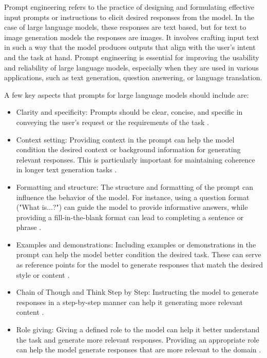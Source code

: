 Prompt engineering refers to the practice of designing and formulating effective input prompts or instructions to elicit desired responses from the model. In the case of large language models, these responses are text based, but for text to image generation models the responses are images. It involves crafting input text in such a way that the model produces outputs that align with the user's intent and the task at hand. Prompt engineering is essential for improving the usability and reliability of large language models, especially when they are used in various applications, such as text generation, question answering, or language translation. \cite{white2023prompt,zhou2022learning,oppenlaender2022prompt,reynolds2021prompt}

A few key aspects that prompts for large language models should include are:
\begin{itemize}
    \item Clarity and specificity: Prompts should be clear, concise, and specific in conveying the user's request or the requirements of the task \cite{}.
    \item Context setting: Providing context in the prompt can help the model condition the desired context or background information for generating relevant responses. This is particularly important for maintaining coherence in longer text generation tasks \cite{}.
    \item Formatting and structure: The structure and formatting of the prompt can influence the behavior of the model. For instance, using a question format ("What is...?") can guide the model to provide informative answers, while providing a fill-in-the-blank format can lead to completing a sentence or phrase \cite{gao2023prompt}.
    \item Examples and demonstrations: Including examples or demonstrations in the prompt can help the model better condition the desired task. These can serve as reference points for the model to generate responses that match the desired style or content \cite{brown2020language, gao2023prompt}.
    \item Chain of Though and Think Step by Step: Instructing the model to generate responses in a step-by-step manner can help it generating more relevant content \cite{wei2023chainofthought}.
    \item Role giving: Giving a defined role to the model can help it better understand the task and generate more relevant responses. Providing an appropriate role can help the model generate responses that are more relevant to the domain \cite{prompt-learn}.
\end{itemize}

